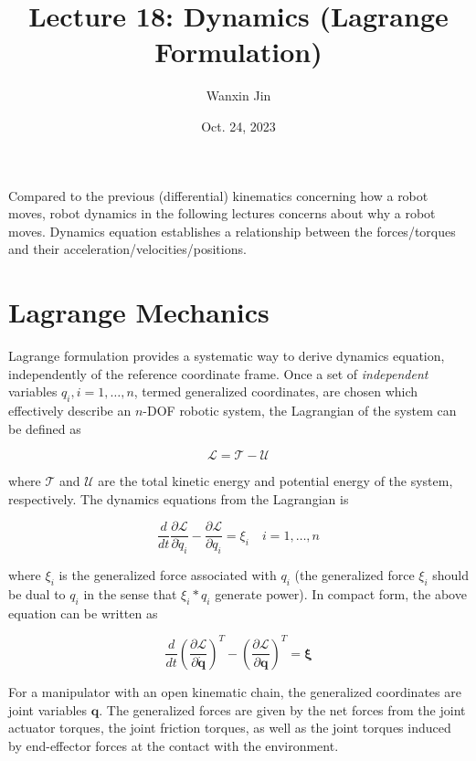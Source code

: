 \documentclass[10pt]{article}
\begin{document}
\title{Lecture 18:  Dynamics (Lagrange Formulation)}
\date{Oct. 24, 2023}
\author{Wanxin Jin}
\maketitle

Compared to the previous (differential) kinematics concerning how a robot moves, robot dynamics in the following lectures concerns about why a robot moves. Dynamics equation establishes a relationship between the forces/torques and their acceleration/velocities/positions.

\section{Lagrange Mechanics}



Lagrange formulation provides a systematic way to derive  dynamics equation, independently of the reference coordinate frame. Once a set of \emph{independent} variables $q_{i}, i=1, \ldots, n$, termed generalized coordinates, are chosen which effectively describe an $n$-DOF robotic system, the Lagrangian of the  system can be defined as

$$
\mathcal{L}=\mathcal{T}-\mathcal{U}
$$

where $\mathcal{T}$ and $\mathcal{U}$ are the total kinetic energy and potential energy of the system, respectively. The dynamics equations from the Lagrangian is

$$
\frac{d}{d t} \frac{\partial \mathcal{L}}{\partial \dot{q}_{i}}-\frac{\partial \mathcal{L}}{\partial q_{i}}=\xi_{i} \quad i=1, \ldots, n
$$

where $\xi_{i}$ is the generalized force associated with  $q_{i}$ (the generalized force $\xi_i$ should be dual to $q_i$ in the sense that $\xi_i*q_i$ generate power). In compact form, the above equation can be written as 

$$
\frac{d}{d t}\left(\frac{\partial \mathcal{L}}{\partial \dot{\boldsymbol{q}}}\right)^{T}-\left(\frac{\partial \mathcal{L}}{\partial \boldsymbol{q}}\right)^{T}=\boldsymbol{\xi}
$$

For a manipulator with an open kinematic chain, the generalized coordinates are  joint variables $\boldsymbol{q}$. The  generalized forces are given by the net forces from  the joint actuator torques, the joint friction torques, as well as the joint torques induced by end-effector forces at the contact with the environment.
\end{document}
